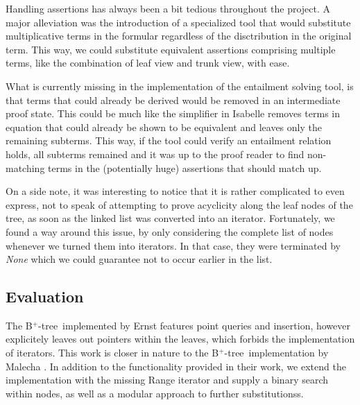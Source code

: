 \documentclass[a4paper,UKenglish,cleveref, autoref, thm-restate]{lipics-v2021}
\newcommand{\btree}{B$^+$-tree}
\begin{document}
Handling assertions has always been
a bit tedious throughout the project.
A major alleviation was the introduction of a specialized tool
that would substitute multiplicative terms in the formular
regardless of the disctribution in the original term.
This way, we could substitute equivalent assertions comprising
multiple terms, like the combination of leaf view and trunk view,
with ease.

What is currently missing in the implementation of the entailment
solving tool, is that terms that could already be derived
would be removed in an intermediate proof state.
This could be much like the simplifier in Isabelle removes terms in equation that could
already be shown to be equivalent and leaves only the remaining subterms.
This way, if the tool could verify an entailment relation holds,
all subterms remained and it was up to the proof reader
to find non-matching terms in the (potentially huge)
assertions that should match up.

On a side note, it was interesting to notice that it is rather complicated
to even express, not to speak of attempting to prove acyclicity
 along the leaf nodes of the tree, as soon as the linked list was converted into an iterator.
Fortunately, we found a way around this issue, by only considering
the complete list of nodes whenever we turned them into
iterators. In that case, they were terminated by \textit{None}
which we could guarantee not to occur earlier in the list.

\subsection{Evaluation}


The \btree\ implemented by Ernst \cite{DBLP:journals/sosym/ErnstSR15} features point queries and insertion,
however explicitely leaves out pointers within the leaves,
which forbids the implementation of iterators.
This work is closer in nature to the \btree\ implementation by Malecha \cite{DBLP:conf/popl/MalechaMSW10}.
In addition to the functionality provided in their work, we extend
the implementation with the missing Range iterator
and supply a binary search within nodes, as well as a modular approach
to further substitutionss.
\end{document}
